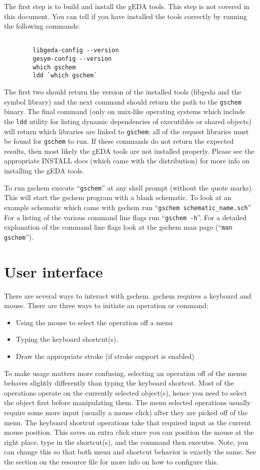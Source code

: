 \documentclass{article}
\begin{document}
The first step is to build and install the gEDA tools.
This step is not covered in this document.  You can tell if you have
installed the tools correctly by running the following commands:
\begin{verbatim}

        libgeda-config --version
        gesym-config --version
        which gschem
        ldd `which gschem`

\end{verbatim}
The first two should return the version of the installed tools
(libgeda and the symbol library) and the next command should return
the path to the {\tt gschem} binary.    The final command (only on
unix-like operating systems which include the {\tt ldd} utility for
listing dynamic dependencies of executibles or shared objects)
will return which libraries are linked to {\tt gschem}; all of the
request libraries must be found for {\tt gschem} to run.  If these commands
do not return the expected results, then most likely the gEDA tools are
not installed properly.  Please see the appropriate INSTALL docs (which
came with the distribution) for more info on installing the gEDA tools.


To run gschem execute ``{\tt gschem}'' at any shell prompt (without
the quote marks).  This will
start the gschem program with a blank schematic.  To look at an
example schematic which came with gschem run ``{\tt gschem
  schematic\_name.sch}'' For a listing of the various command line flags
run ``{\tt gschem -h}''.  For a detailed explanation of the command line
flags look at the gschem man page (``{\tt man gschem}'').

\section{User interface}
There are several ways to interact with gschem.  gschem
requires a keyboard and mouse.  There are three ways to initiate an 
operation or command:
\begin{itemize}
\item Using the mouse to select the operation off a menu 
\item Typing the keyboard shortcut(s).
\item Draw the appropriate stroke (if stroke support is enabled)
\end{itemize}
To make usage matters more confusing, selecting an operation
off of the menus behaves slightly differently than typing the
keyboard shortcut.  Most of the operations operate on the currently
selected object(s), hence you need to select the object first before
manipulating them.  The menu selected operations usually require some
more input (usually a mouse click) after they are picked off of the menu.
The keyboard shortcut operations take that required input as the current
mouse position.  This saves an extra click since you can position
the mouse at the right place, type in the shortcut(s), and the command
then executes.  Note, you can change this so that both menu and shortcut
behavior is exactly the same.  See the section on the resource file for
more info on how to configure this.
\end{document}
